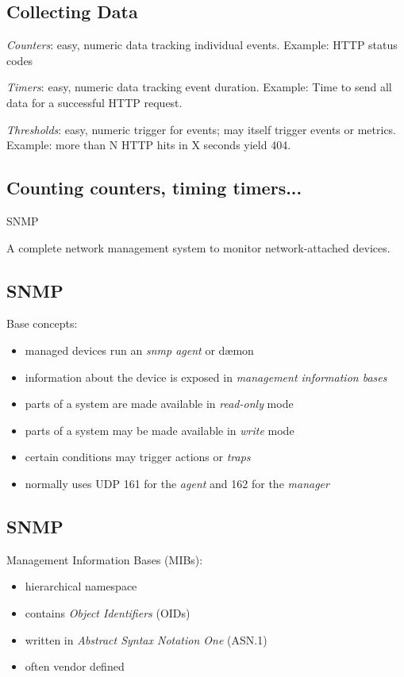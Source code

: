 \documentclass[xga]{xdvislides}
\begin{document}
\subsection{Collecting Data}
{\em Counters}: easy, numeric data tracking individual events. Example: HTTP status codes

\addvspace{.5in}
{\em Timers}: easy, numeric data tracking event duration. Example: Time to send all
data for a successful HTTP request.

\addvspace{.5in}
{\em Thresholds}: easy, numeric trigger for events; may itself trigger events or metrics.
Example: more than N HTTP hits in X seconds yield 404.

\subsection{Counting counters, timing timers...}
SNMP
\vspace{.5in}
\begin{center}
	\Huge
	A complete network management system to monitor network-attached devices.
\end{center}
\Normalsize

\subsection{SNMP}
Base concepts:
\begin{itemize}
	\item managed devices run an {\em snmp agent} or d\ae mon
	\item information about the device is exposed in {\em management information bases}
	\item parts of a system are made available in {\em read-only} mode
	\item parts of a system may be made available in {\em write} mode
	\item certain conditions may trigger actions or {\em traps}
	\item normally uses UDP 161 for the {\em agent} and 162 for the {\em manager}
\end{itemize}

\subsection{SNMP}
Management Information Bases (MIBs):
\begin{itemize}
	\item hierarchical namespace
	\item contains {\em Object Identifiers} (OIDs)
	\item written in {\em Abstract Syntax Notation One} (ASN.1)
	\item often vendor defined
\end{itemize}
\end{document}
